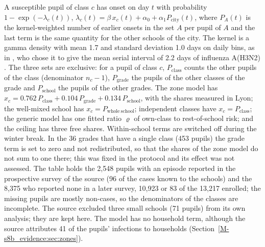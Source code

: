 A susceptible pupil of class $c$ has onset on day $t$ with probability $1-\exp(-\lambda_c(t))$,
$\lambda_c(t)=\beta\,x_c(t)+\alpha_0+\alpha_1P_{\mathrm{city}}(t)$, where $P_A(t)$ is the kernel-weighted
number of earlier onsets in the set $A$ per pupil of $A$ and the last term is the same quantity for the other
schools of the city. The kernel is a gamma density with mean 1.7 and standard deviation 1.0 days on daily bins,
as in \citet{endo2021within}, who chose it to give the mean serial interval of 2.2 days of influenza A(H3N2)
\citep{vink2014serial}. The three sets are exclusive: for a pupil of class $c$, $P_{\mathrm{class}}$ counts the
other pupils of the class (denominator $n_c-1$), $P_{\mathrm{grade}}$ the pupils of the other classes of the
grade and $P_{\mathrm{school}}$ the pupils of the other grades. The zone model has
$x_c=0.762\,P_{\mathrm{class}}+0.104\,P_{\mathrm{grade}}+0.134\,P_{\mathrm{school}}$, with the shares measured
in Lyon; the well-mixed school has $x_c=P_{\mathrm{whole\ school}}$; independent classes have
$x_c=P_{\mathrm{class}}$; the generic model has one fitted ratio $\varrho$ of own-class to rest-of-school risk;
and the ceiling has three free shares. Within-school terms are switched off during the winter break.
In the 36 grades that have a single class (453 pupils) the grade term is set to zero and not redistributed, so
that the shares of the zone model do not sum to one there; this was fixed in the protocol and its effect was
not assessed. The table holds the 2{,}548 pupils with an episode reported in the prospective survey of the
source (96\pct{} of the cases known to the schools) and the 8{,}375 who reported none in a later survey,
10{,}923 or 83\pct{} of the 13{,}217 enrolled; the missing pupils are mostly non-cases, so the denominators of
the classes are incomplete. The source excluded three small schools (71 pupils) from its own analysis; they
are kept here. The model has no household term, although the source attributes 41\pct{} of the pupils'
infections to households (Section~\ref{M-s8b_evidence:sec:zones}).

